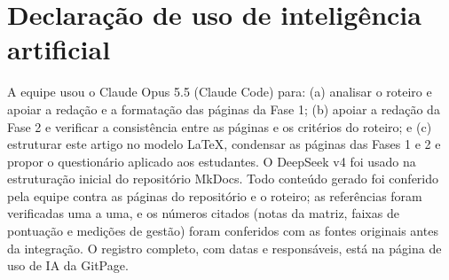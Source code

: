 \section{Declaração de uso de inteligência artificial}
\label{sec:uso-ia}

A equipe usou o Claude Opus 5.5 (Claude Code) para: (a) analisar o roteiro e apoiar a redação e a formatação das páginas da Fase 1; (b) apoiar a redação da Fase 2 e verificar a consistência entre as páginas e os critérios do roteiro; e (c) estruturar este artigo no modelo LaTeX, condensar as páginas das Fases 1 e 2 e propor o questionário aplicado aos estudantes. O DeepSeek v4 foi usado na estruturação inicial do repositório MkDocs. Todo conteúdo gerado foi conferido pela equipe contra as páginas do repositório e o roteiro; as referências foram verificadas uma a uma, e os números citados (notas da matriz, faixas de pontuação e medições de gestão) foram conferidos com as fontes originais antes da integração. O registro completo, com datas e responsáveis, está na página de uso de IA da GitPage.
